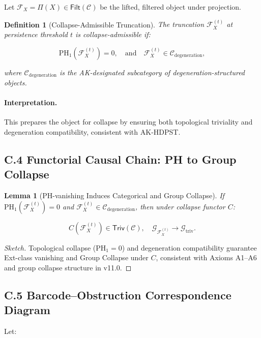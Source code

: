 \documentclass[11pt]{article}
\newtheorem{definition}[theorem]{Definition}
\newtheorem{lemma}[theorem]{Lemma}
\begin{document}
Let \( \mathcal{F}_X = \Pi(X) \in \mathsf{Filt}(\mathcal{C}) \) be the lifted, filtered object under projection.

\begin{definition}[Collapse-Admissible Truncation]
The truncation \( \mathcal{F}_X^{(t)} \) at persistence threshold \( t \) is \emph{collapse-admissible} if:

\[
\mathrm{PH}_1(\mathcal{F}_X^{(t)}) = 0, \quad \text{and} \quad \mathcal{F}_X^{(t)} \in \mathcal{C}_{\mathrm{degeneration}},
\]

where \( \mathcal{C}_{\mathrm{degeneration}} \) is the AK-designated subcategory of degeneration-structured objects.
\end{definition}

\paragraph{Interpretation.}
This prepares the object for collapse by ensuring both topological triviality and degeneration compatibility, consistent with AK-HDPST.

\subsection*{C.4 Functorial Causal Chain: PH to Group Collapse}

\begin{lemma}[PH-vanishing Induces Categorical and Group Collapse]
If \( \mathrm{PH}_1(\mathcal{F}_X^{(t)}) = 0 \) and \( \mathcal{F}_X^{(t)} \in \mathcal{C}_{\mathrm{degeneration}} \), then under collapse functor \( C \):

\[
C(\mathcal{F}_X^{(t)}) \in \mathsf{Triv}(\mathcal{C}), \quad \mathcal{G}_{\mathcal{F}_X^{(t)}} \longrightarrow \mathcal{G}_{\mathrm{triv}}.
\]
\end{lemma}

\begin{proof}[Sketch]
Topological collapse (\( \mathrm{PH}_1 = 0 \)) and degeneration compatibility guarantee Ext-class vanishing and Group Collapse under \( C \), consistent with Axioms A1–A6 and group collapse structure in v11.0.
\end{proof}

\subsection*{C.5 Barcode–Obstruction Correspondence Diagram}

Let:
\end{document}
